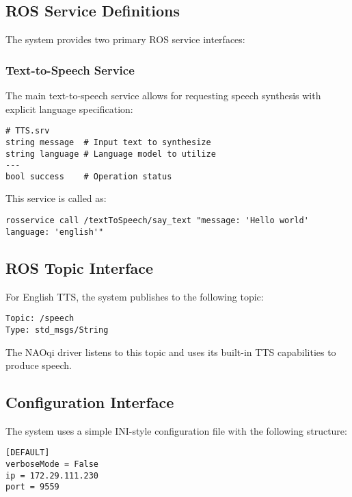 \documentclass{CSSRforAfrica}
\begin{document}
\subsection{ROS Service Definitions}

The system provides two primary ROS service interfaces:

\subsubsection{Text-to-Speech Service}

The main text-to-speech service allows for requesting speech synthesis with explicit language specification:

\newpage

\begin{lstlisting}[style=commandstyle]
# TTS.srv
string message  # Input text to synthesize
string language # Language model to utilize
---
bool success    # Operation status
\end{lstlisting}

This service is called as:
\begin{lstlisting}[style=commandstyle]
rosservice call /textToSpeech/say_text "message: 'Hello world' language: 'english'"
\end{lstlisting}


\subsection{ROS Topic Interface}

For English TTS, the system publishes to the following topic:

\begin{lstlisting}[style=commandstyle]
Topic: /speech
Type: std_msgs/String
\end{lstlisting}

The NAOqi driver listens to this topic and uses its built-in TTS capabilities to produce speech.

\subsection{Configuration Interface}

The system uses a simple INI-style configuration file with the following structure:

\begin{lstlisting}[style=commandstyle]
[DEFAULT]
verboseMode = False
ip = 172.29.111.230
port = 9559
\end{lstlisting}
\end{document}

